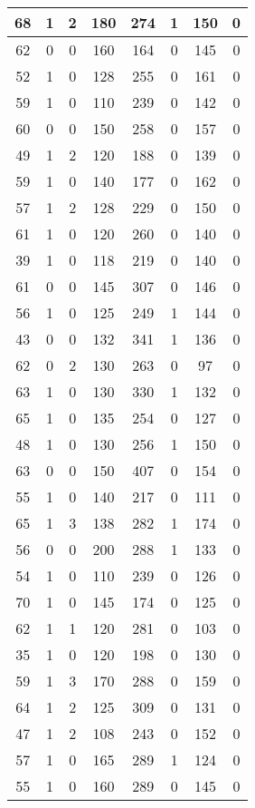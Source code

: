 \documentclass{article}
\begin{document}
\begin{longtable}{|c|c|c|c|c|c|c|c|}
68 & 1 & 2 & 180 & 274 & 1 & 150 & 0 \\ \hline
62 & 0 & 0 & 160 & 164 & 0 & 145 & 0 \\ \hline
52 & 1 & 0 & 128 & 255 & 0 & 161 & 0 \\ \hline
59 & 1 & 0 & 110 & 239 & 0 & 142 & 0 \\ \hline
60 & 0 & 0 & 150 & 258 & 0 & 157 & 0 \\ \hline
49 & 1 & 2 & 120 & 188 & 0 & 139 & 0 \\ \hline
59 & 1 & 0 & 140 & 177 & 0 & 162 & 0 \\ \hline
57 & 1 & 2 & 128 & 229 & 0 & 150 & 0 \\ \hline
61 & 1 & 0 & 120 & 260 & 0 & 140 & 0 \\ \hline
39 & 1 & 0 & 118 & 219 & 0 & 140 & 0 \\ \hline
61 & 0 & 0 & 145 & 307 & 0 & 146 & 0 \\ \hline
56 & 1 & 0 & 125 & 249 & 1 & 144 & 0 \\ \hline
43 & 0 & 0 & 132 & 341 & 1 & 136 & 0 \\ \hline
62 & 0 & 2 & 130 & 263 & 0 & 97 & 0 \\ \hline
63 & 1 & 0 & 130 & 330 & 1 & 132 & 0 \\ \hline
65 & 1 & 0 & 135 & 254 & 0 & 127 & 0 \\ \hline
48 & 1 & 0 & 130 & 256 & 1 & 150 & 0 \\ \hline
63 & 0 & 0 & 150 & 407 & 0 & 154 & 0 \\ \hline
55 & 1 & 0 & 140 & 217 & 0 & 111 & 0 \\ \hline
65 & 1 & 3 & 138 & 282 & 1 & 174 & 0 \\ \hline
56 & 0 & 0 & 200 & 288 & 1 & 133 & 0 \\ \hline
54 & 1 & 0 & 110 & 239 & 0 & 126 & 0 \\ \hline
70 & 1 & 0 & 145 & 174 & 0 & 125 & 0 \\ \hline
62 & 1 & 1 & 120 & 281 & 0 & 103 & 0 \\ \hline
35 & 1 & 0 & 120 & 198 & 0 & 130 & 0 \\ \hline
59 & 1 & 3 & 170 & 288 & 0 & 159 & 0 \\ \hline
64 & 1 & 2 & 125 & 309 & 0 & 131 & 0 \\ \hline
47 & 1 & 2 & 108 & 243 & 0 & 152 & 0 \\ \hline
57 & 1 & 0 & 165 & 289 & 1 & 124 & 0 \\ \hline
55 & 1 & 0 & 160 & 289 & 0 & 145 & 0 \\ \hline

\end{longtable}
\end{document}
